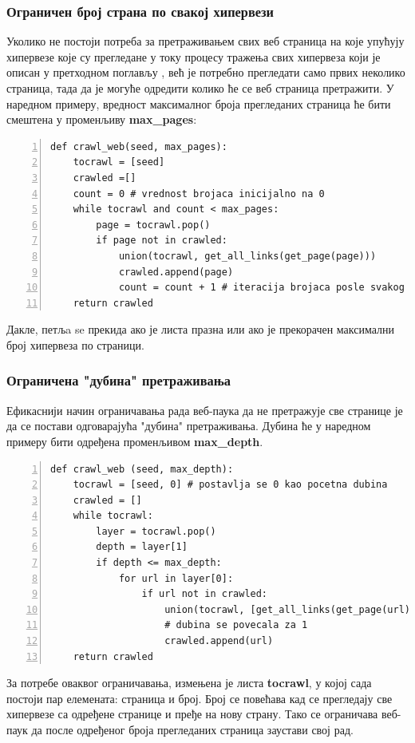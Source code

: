 \documentclass[11pt, serbianc, english, titlepage]{article}
\begin{document}
		\subsubsection{Ограничен број страна по свакој хипервези}
		Уколико не постоји потреба за претраживањем свих веб страница на које упућују хипервезе које су прегледане у току процесу тражења свих хипервеза који је описан у претходном поглављу , већ је потребно прегледати само првих неколико страница, тада да је могуће одредити колико ће се веб страница претражити. У наредном примеру, вредност максималног броја прегледаних страница ће бити смештена у променљиву \textbf{max\_pages}:
		\begin{lstlisting}[caption=Претраживање са ограниченим бројем страна, label={lst:crawlweb2}, numbers=left]
def crawl_web(seed, max_pages):
    tocrawl = [seed]
    crawled =[]
    count = 0 # vrednost brojaca inicijalno na 0
    while tocrawl and count < max_pages:
        page = tocrawl.pop()
        if page not in crawled:
            union(tocrawl, get_all_links(get_page(page)))
            crawled.append(page)
            count = count + 1 # iteracija brojaca posle svakog linka
    return crawled
		\end{lstlisting}
		Дакле, петљa se прекида ако је листа празна или ако је прекорачен максимални број хипервеза по страници. 
		\subsubsection{Ограничена "дубина" претраживања}
		Ефикаснији начин ограничавања рада веб-паука да не претражује све странице је да се постави одговарајућа "дубина" претраживања. Дубина ће у наредном примеру бити одређена променљивом \textbf{max\_depth}.
		\begin{lstlisting}[caption=Скенирање ограничено по дубини, label={lst:crawlweb3}, numbers=left]
def crawl_web (seed, max_depth):
    tocrawl = [seed, 0] # postavlja se 0 kao pocetna dubina
    crawled = []
    while tocrawl:
        layer = tocrawl.pop()
        depth = layer[1]
        if depth <= max_depth:
            for url in layer[0]:
                if url not in crawled:
                    union(tocrawl, [get_all_links(get_page(url)),depth+1])
                    # dubina se povecala za 1
                    crawled.append(url)
    return crawled
		\end{lstlisting}
		За потребе оваквог ограничавања, измењена је листа \textbf{tocrawl}, у којој сада постоји пар елемената: страница и број. Број се повећава кад се прегледају све хипервезе са одређене странице и пређе на нову страну. Тако се  ограничава веб-паук да после одређеног броја прегледаних страница заустави свој рад.
		\pagebreak
\end{document}

